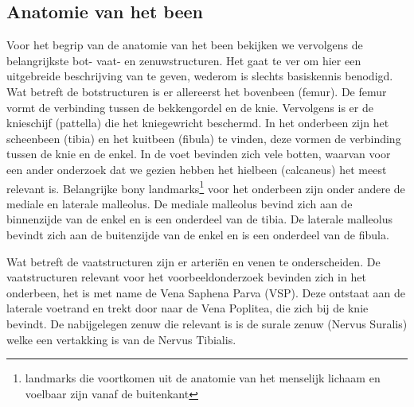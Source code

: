 \subsection{Anatomie van het been}

Voor het begrip van de anatomie van het been bekijken we vervolgens de belangrijkste bot- vaat- en zenuwstructuren. 
Het gaat te ver om hier een uitgebreide beschrijving van te geven, wederom is slechts basiskennis benodigd. Wat betreft de botstructuren is er allereerst het bovenbeen (femur). De femur vormt de verbinding tussen de bekkengordel en de knie. Vervolgens is er de knieschijf (pattella) die het kniegewricht beschermd. In het onderbeen zijn het scheenbeen (tibia) en het kuitbeen (fibula) te vinden, deze vormen de verbinding tussen de knie en de enkel. In de voet bevinden zich vele botten, waarvan voor een ander onderzoek dat we gezien hebben het hielbeen (calcaneus) het meest relevant is. Belangrijke bony landmarks\footnote{landmarks die voortkomen uit de anatomie van het menselijk lichaam en voelbaar zijn vanaf de buitenkant} voor het onderbeen zijn onder andere de mediale en laterale malleolus. De mediale malleolus bevind zich aan de binnenzijde van de enkel en is een onderdeel van de tibia. De laterale malleolus bevindt zich aan de buitenzijde van de enkel en is een onderdeel van de fibula.

Wat betreft de vaatstructuren zijn er arteri\"{e}n en venen te onderscheiden. De vaatstructuren relevant voor het voorbeeldonderzoek bevinden zich in het onderbeen, het is met name de Vena Saphena Parva (VSP). Deze ontstaat aan de laterale voetrand en trekt door naar de Vena Poplitea, die zich bij de knie bevindt. De nabijgelegen zenuw die relevant is is de surale zenuw (Nervus Suralis) welke een vertakking is van de Nervus Tibialis.


